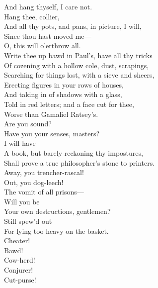 \documentclass[a4paper,oneside]{memoir}
\begin{document}
\begin{drama*}
\subtlespeaks And hang thyself, I care not.\\
\facespeaks {} Hang thee, collier,\\
And all thy pots, and pans, in picture, I will,\\
Since thou hast moved me---\\
\dolspeaks {} O, this will o'erthrow all.\\
\facespeaks Write thee up bawd in Paul's, have all thy tricks\\
Of cozening with a hollow cole, dust, scrapings,\\
Searching for things lost, with a sieve and sheers,\\
Erecting figures in your rows of houses,\\
And taking in of shadows with a glass,\\
Told in red letters; and a face cut for thee,\\
Worse than Gamaliel Ratsey's.\\
\dolspeaks {} Are you sound?\\
Have you your senses, masters?\\
\facespeaks {} I will have\\
A book, but barely reckoning thy impostures,\\
Shall prove a true philosopher's stone to printers.\\
\subtlespeaks Away, you trencher-rascal!\\
\facespeaks {} Out, you dog-leech!\\
The vomit of all prisons---\\
\dolspeaks {} Will you be\\
Your own destructions, gentlemen?\\
\facespeaks {} Still spew'd out\\
For lying too heavy on the basket.\\
\subtlespeaks  {} Cheater!\\
\facespeaks Bawd!\\
\subtlespeaks {} Cow-herd!\\
\facespeaks {} Conjurer!\\
\subtlespeaks {} Cut-purse!\\

\end{drama*}
\end{document}
